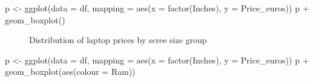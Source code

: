 \documentclass[
  letterpaper,
]{article}
\newenvironment{Shaded}{\begin{snugshade}}{\end{snugshade}}
\newcommand{\AttributeTok}[1]{\textcolor[rgb]{0.40,0.45,0.13}{#1}}
\newcommand{\FunctionTok}[1]{\textcolor[rgb]{0.28,0.35,0.67}{#1}}
\newcommand{\NormalTok}[1]{\textcolor[rgb]{0.00,0.23,0.31}{#1}}
\newcommand{\OtherTok}[1]{\textcolor[rgb]{0.00,0.23,0.31}{#1}}
\newcommand{\SpecialCharTok}[1]{\textcolor[rgb]{0.37,0.37,0.37}{#1}}
\begin{document}
\begin{Shaded}
\begin{Highlighting}[]
\NormalTok{p }\OtherTok{\textless{}{-}} \FunctionTok{ggplot}\NormalTok{(}\AttributeTok{data =}\NormalTok{ df, }\AttributeTok{mapping =} \FunctionTok{aes}\NormalTok{(}\AttributeTok{x =} \FunctionTok{factor}\NormalTok{(Inches), }\AttributeTok{y =}\NormalTok{ Price\_euros))}
\NormalTok{p }\SpecialCharTok{+} \FunctionTok{geom\_boxplot}\NormalTok{()}
\end{Highlighting}
\end{Shaded}

\begin{figure}[H]


\caption{\label{fig-boxplot}Distribution of laptop prices by scree size
group}

\end{figure}%

\begin{Shaded}
\begin{Highlighting}[]
\NormalTok{p }\OtherTok{\textless{}{-}} \FunctionTok{ggplot}\NormalTok{(}\AttributeTok{data =}\NormalTok{ df, }\AttributeTok{mapping =} \FunctionTok{aes}\NormalTok{(}\AttributeTok{x =} \FunctionTok{factor}\NormalTok{(Inches), }\AttributeTok{y =}\NormalTok{ Price\_euros))}
\NormalTok{p }\SpecialCharTok{+} \FunctionTok{geom\_boxplot}\NormalTok{(}\FunctionTok{aes}\NormalTok{(}\AttributeTok{colour =}\NormalTok{ Ram))}
\end{Highlighting}
\end{Shaded}
\end{document}
